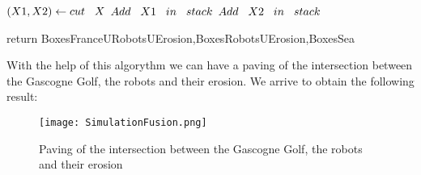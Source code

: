 \begin{algorithm}
\begin{algorithmic}
      	\vspace{0.3 cm}
          			\STATE $(X1, X2)\gets cut \hspace{0.3cm}  X$
          			\STATE $Add \hspace{0.3cm}  X1 \hspace{0.3cm}  in \hspace{0.3cm}  stack$
         			\STATE $Add \hspace{0.3cm}  X2 \hspace{0.3cm}  in \hspace{0.3cm}  stack$
         		\ENDIF
         	
  		\ENDIF
  		 \vspace{0.3 cm}
 	 \ENDWHILE 
	
	\vspace{0.3 cm}
	
  return BoxesFranceURobotsUErosion,BoxesRobotsUErosion,BoxesSea


  \end{algorithmic}
\end{algorithm}

\vfill

\clearpage



\newpage

	With the help of this algorythm we can have a paving of the intersection between the Gascogne Golf, the robots and their erosion. We arrive to obtain the following result:
	

	
	\begin{figure}[!h] 
    \center
    	\texttt{[image: SimulationFusion.png]} 
    	\caption{Paving of the intersection between the Gascogne Golf, the robots and their erosion } 
    \label{S1 U S2}
	\end{figure} 
